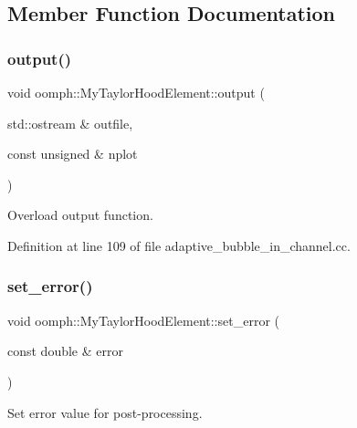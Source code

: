 \subsection{Member Function Documentation}
\mbox{\label{classoomph_1_1MyTaylorHoodElement_a5505717f2d16c2b231e7c347cb0c49b1}} 
\subsubsection{\texorpdfstring{output()}{output()}}
{\footnotesize\ttfamily void oomph\+::\+My\+Taylor\+Hood\+Element\+::output (\begin{DoxyParamCaption}\item[{std\+::ostream \&}]{outfile,  }\item[{const unsigned \&}]{nplot }\end{DoxyParamCaption})\hspace{0.3cm}{\ttfamily [inline]}}



Overload output function. 



Definition at line 109 of file adaptive\+\_\+bubble\+\_\+in\+\_\+channel.\+cc.

\mbox{\label{classoomph_1_1MyTaylorHoodElement_ae4f6eea59b7bcf6e737d829b37c47fe9}} 
\subsubsection{\texorpdfstring{set\+\_\+error()}{set\_error()}}
{\footnotesize\ttfamily void oomph\+::\+My\+Taylor\+Hood\+Element\+::set\+\_\+error (\begin{DoxyParamCaption}\item[{const double \&}]{error }\end{DoxyParamCaption})\hspace{0.3cm}{\ttfamily [inline]}}



Set error value for post-\/processing. 



